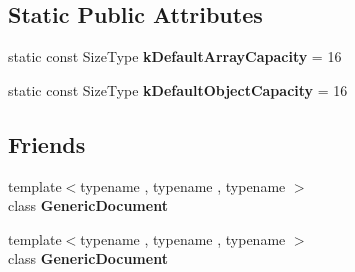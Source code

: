 \subsection*{Static Public Attributes}
\begin{DoxyCompactItemize}
\item 
\mbox{\label{classGenericValue_a622378eb37d924cefac4c2d6aba9c6e3}} 
static const Size\+Type {\bfseries k\+Default\+Array\+Capacity} = 16
\item 
\mbox{\label{classGenericValue_a958912faeb465899d4d358bb1d87fa2c}} 
static const Size\+Type {\bfseries k\+Default\+Object\+Capacity} = 16
\end{DoxyCompactItemize}
\subsection*{Friends}
\begin{DoxyCompactItemize}
\item 
\mbox{\label{classGenericValue_ab05bc9e52e201a2867ea5bac141ee1ae}} 
{\footnotesize template$<$typename , typename , typename $>$ }\\class {\bfseries Generic\+Document}
\item 
\mbox{\label{classGenericValue_a5f64f6939104d4fba0885b2f5f03f14a}} 
{\footnotesize template$<$typename , typename , typename $>$ }\\class {\bfseries Generic\+Document}
\end{DoxyCompactItemize}
